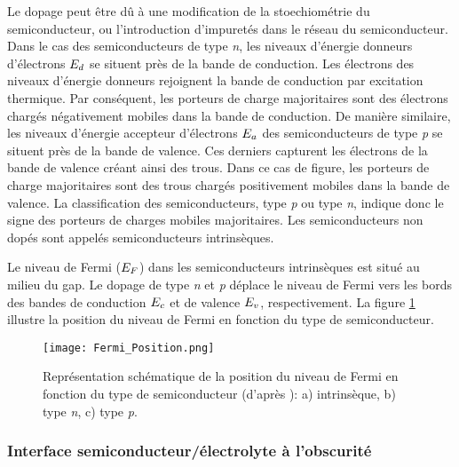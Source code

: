 \begin{refsection}
    Le dopage peut être dû à une modification de la stoechiométrie du semiconducteur, ou l'introduction d'impuretés
    dans le réseau du
    semiconducteur. Dans le cas des semiconducteurs de type \emph{n}, les niveaux d'énergie donneurs d'électrons
    $E_d$ se situent près
    de la bande de conduction. Les électrons des niveaux d'énergie donneurs rejoignent la bande de conduction par
    excitation thermique. Par conséquent, les porteurs de charge majoritaires sont des électrons chargés négativement
    mobiles dans la bande de conduction.
    De manière similaire, les niveaux d'énergie accepteur d'électrons $E_a$ des semiconducteurs de type \emph{p} se
    situent près de la
    bande de valence. Ces derniers capturent les électrons de la bande de valence créant ainsi des trous. Dans ce cas de
    figure, les porteurs de charge majoritaires sont des trous chargés positivement mobiles dans la bande de valence.
    La classification des semiconducteurs, type \emph{p} ou type \emph{n}, indique donc le signe des porteurs de
    charges mobiles
    majoritaires. Les semiconducteurs non dopés sont appelés semiconducteurs intrinsèques.

    Le niveau de Fermi ($E_F$) dans les semiconducteurs intrinsèques est situé au milieu du gap. Le dopage de
    type \emph{n} et \emph{p} déplace le niveau de Fermi vers les bords des bandes de conduction $E_c$ et de valence
    $E_v$, respectivement.
    La figure \ref{fig:fermi_position} illustre la position du niveau de Fermi en fonction du type de semiconducteur.


     \begin{figure}[H]
        \centering
        \texttt{[image: Fermi\_Position.png]}
        \caption[Représentation schématique de la position du niveau de Fermi en fonction du type de semiconducteur:
        a) intrinsèque,
        b) type \emph{n},
        c) type \emph{p}.]
        {Représentation schématique de la position du niveau de Fermi en fonction du type de semiconducteur
            (d'après \citet{Finklea1983}):
        a) intrinsèque,
        b) type \emph{n},
        c) type \emph{p}.}
        \label{fig:fermi_position}
    \end{figure}


    
    \subsubsection{Interface semiconducteur/électrolyte à l'obscurité}
    \label{subsec:semiconductor_electrolyte_contact_dark}
     

\end{refsection}
